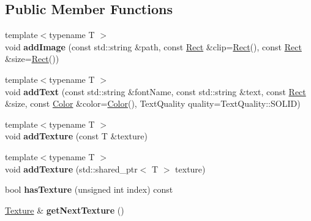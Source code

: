 \subsection*{Public Member Functions}
\begin{DoxyCompactItemize}
\item 
\mbox{\label{classbkengine_1_1Animation_af822f84e07cf2258dbaa85875c08f875}} 
{\footnotesize template$<$typename T $>$ }\\void {\bfseries add\+Image} (const std\+::string \&path, const \hyperlink{structbkengine_1_1Rect}{Rect} \&clip=\hyperlink{structbkengine_1_1Rect}{Rect}(), const \hyperlink{structbkengine_1_1Rect}{Rect} \&size=\hyperlink{structbkengine_1_1Rect}{Rect}())
\item 
\mbox{\label{classbkengine_1_1Animation_a856a210f9d966d910287690a6dbecb23}} 
{\footnotesize template$<$typename T $>$ }\\void {\bfseries add\+Text} (const std\+::string \&font\+Name, const std\+::string \&text, const \hyperlink{structbkengine_1_1Rect}{Rect} \&size, const \hyperlink{structbkengine_1_1Color}{Color} \&color=\hyperlink{structbkengine_1_1Color}{Color}(), Text\+Quality quality=Text\+Quality\+::\+S\+O\+L\+ID)
\item 
\mbox{\label{classbkengine_1_1Animation_a1f322fcb75e0128ae9a61580291c5637}} 
{\footnotesize template$<$typename T $>$ }\\void {\bfseries add\+Texture} (const T \&texture)
\item 
\mbox{\label{classbkengine_1_1Animation_a44c346878aafe731e46f303d518affe0}} 
{\footnotesize template$<$typename T $>$ }\\void {\bfseries add\+Texture} (std\+::shared\+\_\+ptr$<$ T $>$ texture)
\item 
\mbox{\label{classbkengine_1_1Animation_a41a3d19e22693a3cf8d82309d6ef9580}} 
bool {\bfseries has\+Texture} (unsigned int index) const
\item 
\mbox{\label{classbkengine_1_1Animation_a949c440102e5e9c419829992d7902df8}} 
\hyperlink{classbkengine_1_1Texture}{Texture} \& {\bfseries get\+Next\+Texture} ()

\end{DoxyCompactItemize}
